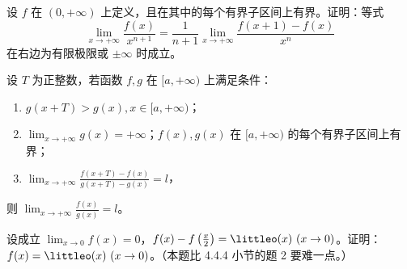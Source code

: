 \begin{xreferenceproblem}[13]
设 $f$ 在 $(0,+\infty)$ 上定义，且在其中的每个有界子区间上有界。证明：等式
  \[
    \lim_{x\to+\infty}\frac{f(x)}{x^{n+1}}
    =\frac1{n+1}\lim_{x\to+\infty}\frac{f(x+1)-f(x)}{x^n}
  \]
  在右边为有限极限或 $\pm\infty$ 时成立。
\end{xreferenceproblem}

\begin{xreferenceproblem}[14]
设 $T$ 为正整数，若函数 $f,g$ 在 $[a,+\infty)$ 上满足条件：
  \begin{enumerate}
    \item $g(x+T)>g(x),x\in[a,+\infty)$；
    \item $\displaystyle\lim_{x\to+\infty}g(x)=+\infty$；$f(x),g(x)$ 在 $[a,+\infty)$ 的每个有界子区间上有界；
    \item $\displaystyle\lim_{x\to+\infty}\frac{f(x+T)-f(x)}{g(x+T)-g(x)}=l$，
  \end{enumerate}
  则 $\displaystyle\lim_{x\to+\infty}\frac{f(x)}{g(x)}=l$。
\end{xreferenceproblem}

\begin{xreferenceproblem}[15]
设成立 $\displaystyle\lim_{x\to0}f(x)=0$，$f(x)-f\left(\frac x2\right)=\littleo(x)\ (x\to0)$。证明：$f(x)=\littleo(x)\ (x\to0)$。（本题比 4.4.4 小节的题 2 要难一点。）
\end{xreferenceproblem}
